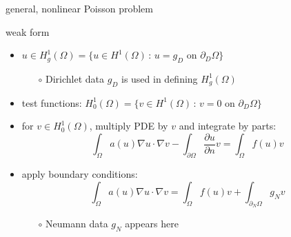 \documentclass[hide notes,intlimits,usenames,dvipsnames]{beamer}
\newcommand{\grad}{\nabla}
\begin{document}
\begin{frame}{general, nonlinear Poisson problem}
\begin{center}

\end{center}
\end{frame}


\begin{frame}{weak form}
\begin{itemize}
\item $u\in H_g^1(\Omega) = \{u\in H^1(\Omega)\,:\,u=g_D \text{ on } \partial_D\Omega\}$
    \begin{itemize}
    \item[$\circ$] Dirichlet data $g_D$ is used in defining $H^1_g(\Omega)$
    \end{itemize}
\item test functions: $H_0^1(\Omega) = \{v\in H^1(\Omega)\,:\,v=0 \text{ on } \partial_D\Omega\}$
\item for $v\in H^1_0(\Omega)$, multiply PDE by $v$ and integrate by parts:
\begin{equation*}
\int_\Omega a(u) \grad u \cdot \grad v - \int_{\partial\Omega} \frac{\partial u}{\partial n} v = \int_\Omega f(u) v
\end{equation*}
\item apply boundary conditions:
\begin{equation*}
\int_\Omega a(u) \grad u \cdot \grad v = \int_\Omega f(u) v + \int_{\partial_N\Omega} g_N v \tag{WF}
\end{equation*}

\vspace{-2mm}
    \begin{itemize}
    \item[$\circ$] Neumann data $g_N$ appears here
    \end{itemize}
\end{itemize}
\end{frame}
\end{document}
